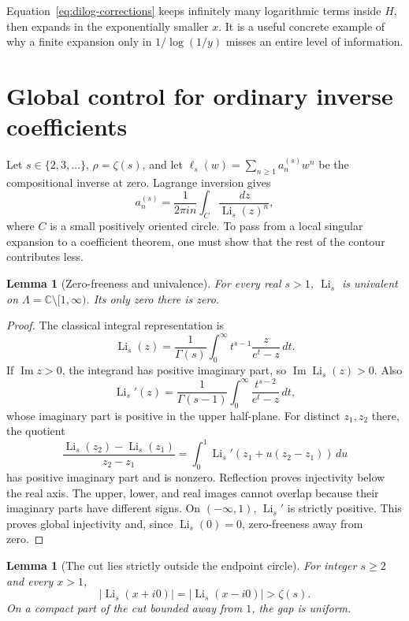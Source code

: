 \documentclass[11pt,a4paper]{article}
\numberwithin{equation}{section}
\newtheorem{lemma}[theorem]{Lemma}
\theoremstyle{definition}
\theoremstyle{remark}
\DeclareMathOperator{\Li}{Li}
\DeclareMathOperator{\Ima}{Im}
\newcommand{\C}{\mathbb C}
\newcommand{\dd}{\,d}
\newcommand{\LiInv}{\ell}
\begin{document}
Equation~\eqref{eq:dilog-corrections} keeps infinitely many logarithmic
terms inside \(H\), then expands in the exponentially smaller \(x\).
It is a useful concrete example of why a finite expansion only in
\(1/\log(1/y)\) misses an entire level of information.

\section{Global control for ordinary inverse coefficients}
\label{sec:global}

Let \(s\in\{2,3,\ldots\}\), \(\rho=\zeta(s)\), and let
\(\LiInv_s(w)=\sum_{n\ge1}a_n^{(s)}w^n\) be the compositional inverse
at zero.  Lagrange inversion gives
\begin{equation}
 a_n^{(s)}
 =\frac{1}{2\pi i n}\int_C\frac{\dd z}{\Li_s(z)^n},
 \label{eq:lagrange-contour}
\end{equation}
where \(C\) is a small positively oriented circle.
To pass from a local singular expansion to a coefficient theorem, one
must show that the rest of the contour contributes less.

\begin{lemma}[Zero-freeness and univalence]
\label{lem:univalence}
For every real \(s>1\), \(\Li_s\) is univalent on
\(\Lambda=\C\setminus[1,\infty)\).  Its only zero there is zero.
\end{lemma}

\begin{proof}
The classical integral representation \cite{dlmf-poly} is
\[
 \Li_s(z)=\frac1{\Gamma(s)}
 \int_0^\infty t^{s-1}\frac{z}{e^t-z}\dd t.
\]
If \(\Ima z>0\), the integrand has positive imaginary part, so
\(\Ima\Li_s(z)>0\).
Also
\[
 \Li_s'(z)=\frac1{\Gamma(s-1)}
 \int_0^\infty\frac{t^{s-2}}{e^t-z}\dd t,
\]
whose imaginary part is positive in the upper half-plane.
For distinct \(z_1,z_2\) there, the quotient
\[
 \frac{\Li_s(z_2)-\Li_s(z_1)}{z_2-z_1}
 =\int_0^1\Li_s'(z_1+u(z_2-z_1))\dd u
\]
has positive imaginary part and is nonzero.
Reflection proves injectivity below the real axis.
The upper, lower, and real images cannot overlap because their
imaginary parts have different signs.
On \((-\infty,1)\), \(\Li_s'\) is strictly positive.
This proves global injectivity and, since \(\Li_s(0)=0\), zero-freeness
away from zero.
\end{proof}

\begin{lemma}[The cut lies strictly outside the endpoint circle]
\label{lem:cutgap}
For integer \(s\ge2\) and every \(x>1\),
\begin{equation}
 |\Li_s(x+i0)|=|\Li_s(x-i0)|>\zeta(s).
 \label{eq:cutgap}
\end{equation}
On a compact part of the cut bounded away from \(1\), the gap is uniform.
\end{lemma}
\end{document}
